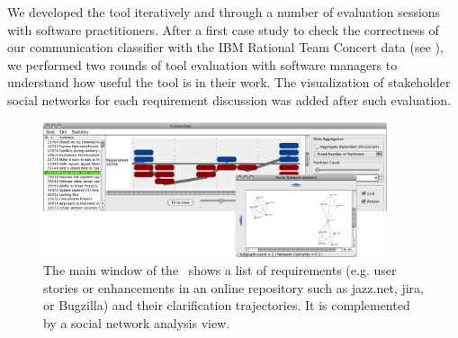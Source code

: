 We developed the tool iteratively and through a number of evaluation sessions with software practitioners. 
After a first case study to check the correctness of our communication classifier with the IBM Rational Team Concert data (see \cite{Knauss2012f}), we performed two rounds of tool evaluation with software managers to understand how useful the tool is in their work. 
The visualization of stakeholder social networks for each requirement discussion was added after such evaluation. 


\begin{figure}
\centering
\includegraphics[width=0.9\textwidth]{img/vissuelizer-screenshot}
\caption{The main window of the \viss\ shows a list of requirements (e.g. user stories or enhancements in an online repository such as jazz.net, jira, or Bugzilla) and their clarification trajectories. It is complemented by a social network analysis view.}
\label{fig:screenshot}
\end{figure}